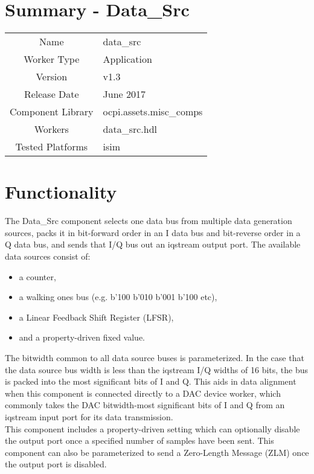 \documentclass{article}
\author{} %
\date{Version \docVersion} %
\title{\docTitle}
\def\comp{data\_src}
\def\Comp{TEMP}
\def\Comp{Data\_Src }
\begin{document}
\section*{Summary - \Comp}
\begin{tabular}{|c|M{13.5cm}|}
	\hline
	                  &                                                                                \\
	\hline
	Name              & \comp                                                                          \\
	\hline
	Worker Type       & Application                                                                    \\
	\hline
	Version           &  v1.3                                                                         \\
	\hline
	Release Date      & June 2017 \\
	\hline
	Component Library & ocpi.assets.misc\_comps \\
	\hline
	Workers           & \comp.hdl \\
	\hline
	Tested Platforms  & isim \\
	\hline
\end{tabular}

\section*{Functionality}
\begin{flushleft}
\justify
  The \Comp component selects one data bus from multiple data generation sources, packs it in bit-forward order in an I data bus and bit-reverse order in a Q data bus, and sends that I/Q bus out an iqstream output port. The available data sources consist of:
  \begin{itemize}
  \item a counter,
  \item a walking ones bus (e.g. b'100 \textrightarrow b'010 \textrightarrow b'001 \textrightarrow b'100 \textrightarrow etc),
  \item a Linear Feedback Shift Register (LFSR),
  \item and a property-driven fixed value.
  \end{itemize}
  The bitwidth common to all data source buses is parameterized. In the case that the data source bus width is less than the iqstream I/Q widths of 16 bits, the bus is packed into the most significant bits of I and Q. This aids in data alignment when this component is connected directly to a DAC device worker, which commonly takes the DAC bitwidth-most significant bits of I and Q from an iqstream input port for its data transmission. \\ \medskip
  This component includes a property-driven setting which can optionally disable the output port once a specified number of samples have been sent. This component can also be parameterized to send a Zero-Length Message (ZLM) once the output port is disabled.
\end{flushleft}
\end{document}
